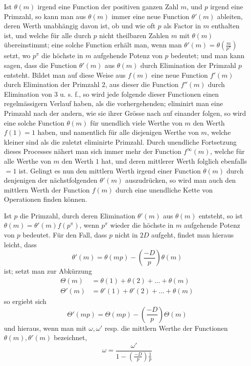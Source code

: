 Ist $\theta(m)$ irgend eine Function der positiven ganzen Zahl $m$, und $p$ irgend eine Primzahl, so kann man aus $\theta(m)$ immer eine neue Function $\theta'(m)$ ableiten, deren Werth unabhängig davon ist, ob und wie oft $p$ als Factor in $m$ enthalten ist, und welche für alle durch $p$ nicht theilbaren Zahlen $m$ mit $\theta(m)$ übereinstimmt; eine solche Function erhält man, wenn man $\theta'(m)=\theta\left(\frac m{p^\pi}\right)$ setzt, wo $p^\pi$ die höchste in $m$ aufgehende Potenz von $p$ bedeutet; und man kann sagen, dass die Function $\theta'(m)$ aus $\theta(m)$ durch Elimination der Primzahl $p$ entsteht. Bildet man auf diese Weise aus $f(m)$ eine neue Function $f'(m)$ durch Elimination der Primzahl $2$, aus dieser die Function $f''(m)$ durch Elimination von $3$ u. s. f., so wird jede folgende dieser Functionen einen regelmässigern Verlauf haben, als die vorhergehenden; eliminirt man eine Primzahl nach der andern, wie sie ihrer Grösse nach auf einander folgen, so wird eine solche Function
%
$\theta(m)$ für unendlich viele Werthe von $m$ den Werth $f(1)=1$ haben, und namentlich für alle diejenigen Werthe von $m$, welche kleiner sind als die zuletzt eliminirte Primzahl. Durch unendliche Fortsetzung dieses Processes nähert man sich immer mehr der Function $f^\infty(m)$, welche für alle Werthe von $m$ den Werth $1$ hat, und deren mittlerer Werth folglich ebenfalls $=1$ ist. Gelingt es nun den mittlern Werth irgend einer Function $\theta(m)$ durch denjenigen der nächstfolgenden $\theta'(m)$ auszudrücken, so wird man auch den mittlern Werth der Function $f(m)$ durch eine unendliche Kette von Operationen finden können.

Ist $p$ die Primzahl, durch deren Elimination $\theta'(m)$ aus $\theta(m)$ entsteht, so ist $\theta(m)=\theta'(m)f(p^\pi)$, wenn $p^\pi$ wieder die höchste in $m$ aufgehende Potenz von $p$ bedeutet. Für den Fall, dass $p$ nicht in $2D$ aufgeht, findet man hieraus leicht, dass
\[
\theta'(m)=\theta(mp)-\left(\frac{-D}p\right)\theta(m)
\]
ist; setzt man zur Abkürzung
\[
\begin{aligned}
\Theta(m)&=\theta(1)+\theta(2)+\ldots+\theta(m)\\
\Theta'(m)&=\theta'(1)+\theta'(2)+\ldots+\theta(m)
\end{aligned}
\]
so ergiebt sich
\[
\Theta'(mp)=\Theta(mp)-\left(\frac{-D}p\right)\Theta(m)
\]
und hieraus, wenn man mit $\omega,\omega'$ resp. die mittlern Werthe der Functionen $\theta(m),\theta'(m)$ bezeichnet,
\[
\omega=\frac{\omega'}{1-\left(\frac{-D}p\right)\frac1p}
\]

